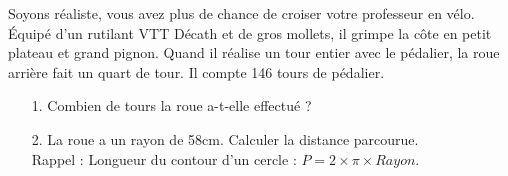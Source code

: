 Soyons réaliste, vous avez plus de chance de croiser votre professeur en vélo. Équipé d'un rutilant VTT Décath et de gros mollets, il grimpe la côte en petit plateau et grand pignon. Quand il réalise un tour entier avec le pédalier, la roue arrière fait un quart de tour. Il compte 146 tours de pédalier. 

\begin{enumerate}
  \item[1.] Combien de tours la roue a-t-elle effectué ?
  \item[2.] La roue a un rayon de 58cm. Calculer la distance parcourue. \\
    Rappel : Longueur du contour d'un cercle : $P = 2 \times \pi \times Rayon$.   
\end{enumerate}

